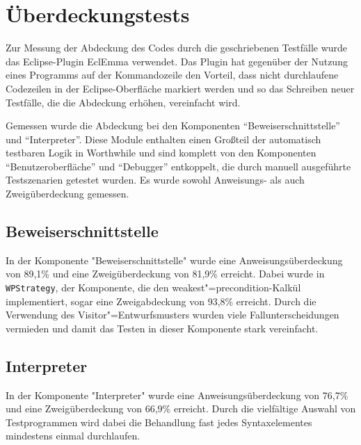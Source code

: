 \section{Überdeckungstests}
Zur Messung der Abdeckung des Codes durch die geschriebenen Testfälle wurde das Eclipse-Plugin EclEmma verwendet. Das Plugin hat gegenüber der Nutzung eines Programms auf der Kommandozeile den Vorteil, dass nicht durchlaufene Codezeilen in der Eclipse-Oberfläche markiert werden und so das Schreiben neuer Testfälle, die die Abdeckung erhöhen, vereinfacht wird.

Gemessen wurde die Abdeckung bei den Komponenten ``Beweiserschnittstelle'' und ``Interpreter''. Diese Module enthalten einen Großteil der automatisch testbaren Logik in Worthwhile und sind komplett von den Komponenten ``Benutzeroberfläche'' und ``Debugger'' entkoppelt, die durch manuell ausgeführte Testszenarien getestet wurden. Es wurde sowohl Anweisungs- als auch Zweigüberdeckung gemessen.

\subsection{Beweiserschnittstelle}
In der Komponente "Beweiserschnittstelle" wurde eine Anweisungsüberdeckung von 89,1\% und eine Zweigüberdeckung von 81,9\% erreicht. Dabei wurde in \texttt{WPStrategy}, der Komponente, die den weakest"=precondition-Kalkül implementiert, sogar eine Zweigabdeckung von 93,8\% erreicht. Durch die Verwendung des Visitor"=Entwurfsmusters wurden viele Fallunterscheidungen vermieden und damit das Testen in dieser Komponente stark vereinfacht.

\subsection{Interpreter}
In der Komponente "Interpreter" wurde eine Anweisungsüberdeckung von 76,7\% und eine Zweigüberdeckung von 66,9\% erreicht. Durch die vielfältige Auswahl von Testprogrammen wird dabei die Behandlung fast jedes Syntaxelementes mindestens einmal durchlaufen.
